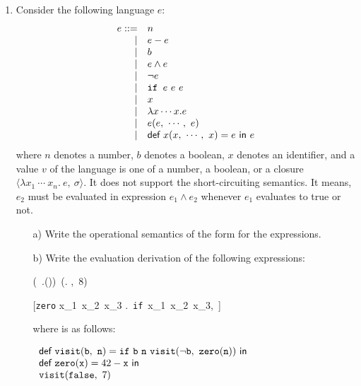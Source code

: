 \begin{enumerate}
\item Consider the following language $e$:
\[
\begin{array}{rll}
e ::= & n\\
\mid& \esub{e}{e}\\
\mid& b\\
\mid& e \wedge e\\
\mid& \neg e\\
\mid& \verb!if ! e\ e\ e\\
\mid& x\\
\mid& \lambda x \cdots x. e\\
\mid& e(e,\ \cdots,\ e)\\
\mid& \textsf{def}\ x(x,\ \cdots,\ x)=e\ \textsf{in}\ e
\end{array}
\]
where $n$ denotes a number, $b$ denotes a boolean, $x$ denotes an identifier,
and a value $v$ of the language is one of a number, a boolean, or a closure
$\langle \lambda x_1\ \cdots\ x_n .\ e,\ \sigma\rangle$.
It does not support the short-circuiting semantics.
It means, $e_2$ must be evaluated in expression $e_1 \wedge e_2$ whenever $e_1$ evaluates to true or not.
\begin{itemize}
  \item[a)]
Write the operational semantics of the form  for the expressions.
  \item[b)] Write the evaluation derivation of the following expressions:

\hspace*{-5em}
\derive {\hspace*{\textwidth}}
{\emptyset\vdash (\lambda {}\ .())\
(\lambda \cx. \cx,\ 8) \Rightarrow~~~~~~~~}


\hspace*{-5em}
\derive
{\hspace*{\textwidth}}
{[\texttt{zero} \mapsto \langle 
\lambda x_1\ x_2\ x_3 .\ 
\texttt{if}\ x_1\ x_2\ x_3,\
\emptyset\rangle] \vdash {}
\Rightarrow~~~~~~~~
}

\bigskip
where  is as follows:

$
\begin{array}{l}
  \textsf{def}\ \texttt{visit}(\texttt{b},\ \texttt{n}) = \texttt{if}\ \texttt{b}\ \texttt{n}\ \texttt{visit} (\neg \texttt{b},\ \texttt{zero}(\texttt{n}))\ \textsf{in} \\
  \textsf{def}\ \texttt{zero}(\texttt{x}) = 42-\texttt{x}\ \textsf{in} \\
  \texttt{visit}(\texttt{false},\ 7)
\end{array}
$


\end{itemize}
\end{enumerate}
